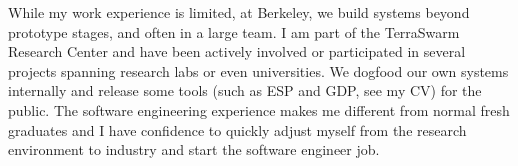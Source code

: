\documentclass[11pt, letterpaper]{awesome-cv}
\begin{document}
\begin{cvletter}
  While my work experience is limited, at Berkeley, we build systems beyond
  prototype stages, and often in a large team. I am part of the TerraSwarm
  Research Center and have been actively involved or participated in several
  projects spanning research labs or even universities. We dogfood our own
  systems internally and release some tools (such as ESP and GDP, see my CV) for
  the public. The software engineering experience makes me different from normal
  fresh graduates and I have confidence to quickly adjust myself from the
  research environment to industry and start the software engineer job.

\end{cvletter}

\makeletterclosing
\end{document}
